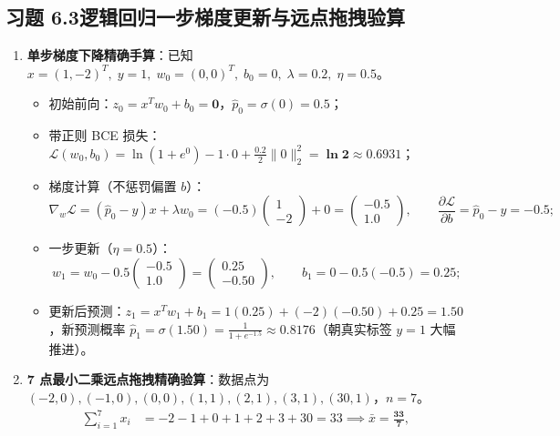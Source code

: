 \subsection*{习题 6.3\quad 逻辑回归一步梯度更新与远点拖拽验算}
\begin{enumerate}[label=(\alph*), leftmargin=1.8em]
  \item \textbf{单步梯度下降精确手算}：已知 $x=(1, -2)^T,\; y=1,\; w_0=(0,0)^T,\; b_0=0,\; \lambda=0.2,\; \eta=0.5$。
  \begin{itemize}
    \item 初始前向：$z_0 = x^T w_0 + b_0 = \mathbf{0}$，$\hat{p}_0 = \sigma(0) = \mathbf{0.5}$；
    \item 带正则 BCE 损失：$\mathcal{L}(w_0, b_0) = \ln(1 + e^0) - 1\cdot 0 + \frac{0.2}{2}\|0\|_2^2 = \mathbf{\ln 2 \approx 0.6931}$；
    \item 梯度计算（不惩罚偏置 $b$）：
    \[
      \nabla_w \mathcal{L} = (\hat{p}_0 - y)x + \lambda w_0 = (-0.5)\begin{pmatrix} 1 \\ -2 \end{pmatrix} + 0 = \begin{pmatrix} \mathbf{-0.5} \\ \mathbf{1.0} \end{pmatrix}, \qquad
      \frac{\partial \mathcal{L}}{\partial b} = \hat{p}_0 - y = \mathbf{-0.5};
    \]
    \item 一步更新（$\eta = 0.5$）：
    \[
      w_1 = w_0 - 0.5\begin{pmatrix} -0.5 \\ 1.0 \end{pmatrix} = \begin{pmatrix} \mathbf{0.25} \\ \mathbf{-0.50} \end{pmatrix}, \qquad
      b_1 = 0 - 0.5(-0.5) = \mathbf{0.25};
    \]
    \item 更新后预测：$z_1 = x^T w_1 + b_1 = 1(0.25) + (-2)(-0.50) + 0.25 = \mathbf{1.50}$，新预测概率 $\hat{p}_1 = \sigma(1.50) = \frac{1}{1 + e^{-1.5}} \approx \mathbf{0.8176}$（朝真实标签 $y=1$ 大幅推进）。
  \end{itemize}
  \item \textbf{7 点最小二乘远点拖拽精确验算}：数据点为 $(-2,0), (-1,0), (0,0), (1,1), (2,1), (3,1), (30,1)$，$n=7$。
  \begin{align*}
    \sum_{i=1}^7 x_i &= -2 - 1 + 0 + 1 + 2 + 3 + 30 = 33 \implies \bar{x} = \mathbf{\frac{33}{7}}, \\

\end{align*}
\end{enumerate}
